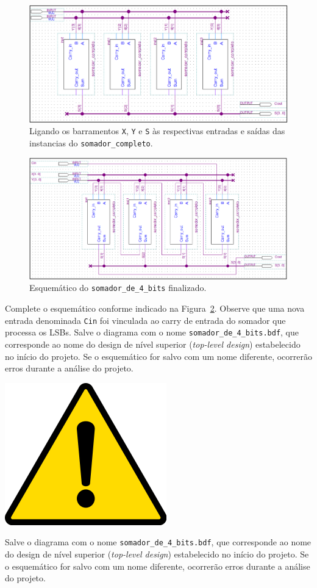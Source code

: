 \documentclass[12pt,a4paper]{article}
\newcommand{\Attention}[1]{
    \begin{tcolorbox}[colback=red!5!white, colframe=red!75!black]
        \noindent
        \begin{minipage}[c]{1cm}%
            \includegraphics[width=\linewidth]{figs/attention.png}
        \end{minipage}%
        \hfill%
        \begin{minipage}[c]{\dimexpr\linewidth-1cm-2mm}%
            \begin{center}
                #1    
            \end{center}            
        \end{minipage}
    \end{tcolorbox}
}
\begin{document}
\begin{figure}[htbp!]
    \centering
    \includegraphics[width=\textwidth]{./figs/fig21.png}
    \caption{Ligando os barramentos \texttt{X}, \texttt{Y} e \texttt{S} às respectivas entradas e saídas das instancias do \texttt{somador\_completo}.}
    \label{fig:21}
\end{figure}

\begin{figure}[htbp!]
    \centering
    \includegraphics[width=\textwidth]{./figs/fig22.png}
    \caption{Esquemático do \texttt{somador\_de\_4\_bits} finalizado.}
    \label{fig:22}
\end{figure}

Complete o esquemático conforme indicado na Figura~\ref{fig:22}. Observe que uma nova entrada denominada \texttt{Cin} foi vinculada ao carry de entrada do somador que processa os LSBs. Salve o diagrama com o nome \texttt{somador\_de\_4\_bits.bdf}, que corresponde ao nome do design de nível superior (\textit{top-level design}) estabelecido no início do projeto. Se o esquemático for salvo com um nome diferente, ocorrerão erros durante a análise do projeto.

\Attention{Salve o diagrama com o nome \texttt{somador\_de\_4\_bits.bdf}, que corresponde ao nome do design de nível superior (\textit{top-level design}) estabelecido no início do projeto. Se o esquemático for salvo com um nome diferente, ocorrerão erros durante a análise do projeto.}
\end{document}
